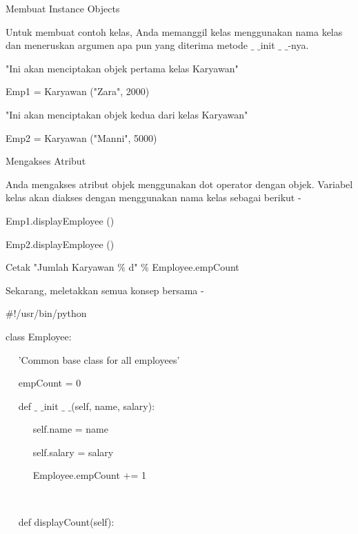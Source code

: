 \documentclass[a4paper,12pt]{report}
\begin{document}
\noindent 
Membuat Instance Objects \par
\vspace{12pt}
\noindent 
Untuk membuat contoh kelas, Anda memanggil kelas menggunakan nama kelas dan meneruskan argumen apa pun yang diterima metode  $  \_  $ $  \_  $init $  \_  $ $  \_  $-nya. \par
\vspace{12pt}
\noindent 
"Ini akan menciptakan objek pertama kelas Karyawan" \par
\noindent 
Emp1 = Karyawan ("Zara", 2000) \par
\noindent 
"Ini akan menciptakan objek kedua dari kelas Karyawan" \par
\noindent 
Emp2 = Karyawan ("Manni", 5000) \par
\vspace{12pt}
\noindent 
Mengakses Atribut \par
\vspace{12pt}
\noindent 
Anda mengakses atribut objek menggunakan dot operator dengan objek. Variabel kelas akan diakses dengan menggunakan nama kelas sebagai berikut - \par
\vspace{12pt}
\noindent 
Emp1.displayEmployee () \par
\noindent 
Emp2.displayEmployee () \par
\noindent 
Cetak "Jumlah Karyawan $  \%  $ d" $  \%  $ Employee.empCount \par
\vspace{12pt}
\noindent 
Sekarang, meletakkan semua konsep bersama - \par
\noindent 
 $  \#  $!/usr/bin/python \par
\vspace{12pt}
\noindent 
class Employee: \par
\noindent 
~~ 'Common base class for all employees' \par
\noindent 
~~ empCount = 0 \par
\vspace{12pt}
\noindent 
~~ def  $  \_  $ $  \_  $init $  \_  $ $  \_  $(self, name, salary): \par
\noindent 
~~~~~ self.name = name \par
\noindent 
~~~~~ self.salary = salary \par
\noindent 
~~~~~ Employee.empCount += 1 \par
\noindent 
~~  \par
\noindent 
~~ def displayCount(self): \par
\end{document}
